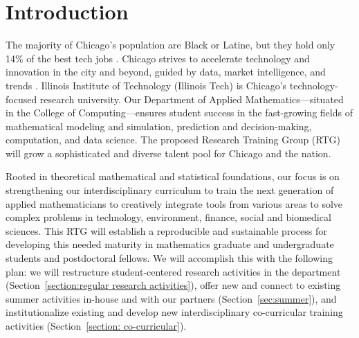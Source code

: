 \documentclass[11pt]{NSFamsart}
\begin{document}
\section{Introduction}

The majority of Chicago's population are Black or Latine, 
but they hold only 14\% of the best tech jobs \cite{P33}. 
Chicago strives to accelerate  technology and innovation in the city and beyond, guided by data, market intelligence, and trends \cite{Chicago}. Illinois Institute of Technology (Illinois Tech) is Chicago's technology-focused research university.  Our Department of Applied Mathematics---situated in the College of Computing---ensures student success in the fast-growing fields of mathematical modeling and simulation, prediction and decision-making, computation, and data science. 
The proposed Research Training Group (RTG) will grow a sophisticated and diverse talent pool for Chicago and the nation. 

Rooted in theoretical mathematical and statistical foundations, our focus is on strengthening our interdisciplinary curriculum to train the next generation of applied mathematicians to creatively integrate tools from various areas to solve complex problems in technology, environment, finance, social and biomedical sciences. This RTG will establish  a reproducible and sustainable process for developing this needed maturity in mathematics graduate and undergraduate students and postdoctoral fellows. We will accomplish this with the following plan:  we will restructure student-centered research activities in the department (Section~\ref{section:regular research activities}), offer new and connect to existing summer activities in-house and with our partners (Section~\ref{sec:summer}), and institutionalize existing and develop new interdisciplinary co-curricular training activities (Section~\ref{section: co-curricular}). 
\end{document}
